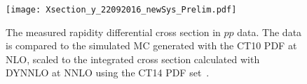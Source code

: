 \documentclass[3p,times,twocolumn]{elsarticle}
\newcommand*{\Zboson}{\ensuremath{Z}\xspace}
\newcommand*{\pp}{\ensuremath{pp}\xspace}
\newcommand*{\Zmm}{\ensuremath{Z\rightarrow\mu\mu}\xspace}
\newcommand*{\pT}{\ensuremath{p_{\text{T}}}\xspace}
\newcommand{\yZ}{\mbox{$y^{Z}$}\xspace}
\newcommand*{\GeV}{\mbox{GeV}\xspace}
\newcommand*{\GEANT}{\textsc{Geant}\xspace}
\begin{document}







\begin{figure}[ht!]
\centering
\texttt{[image: Xsection\_y\_22092016\_newSys\_Prelim.pdf]}
\caption{The measured rapidity differential cross section in \pp data.  The data is compared to the simulated MC generated with the CT10 PDF at NLO, scaled to the integrated cross section calculated with DYNNLO at NNLO using the CT14 PDF set~\cite{me:2016}.}
\label{fig:Xsection}
\end{figure}
\end{document}
